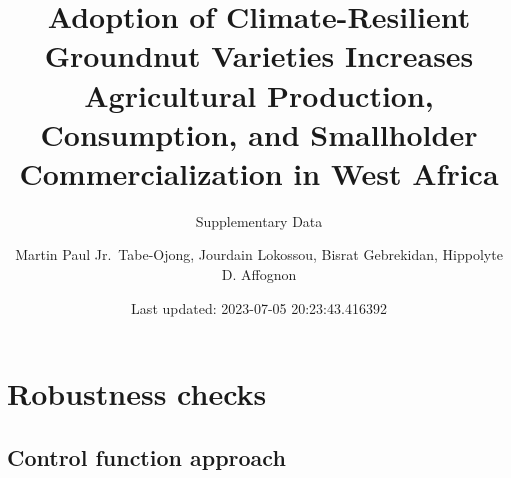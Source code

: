 \documentclass[
]{article}
\title{Adoption of Climate-Resilient Groundnut Varieties Increases Agricultural Production, Consumption, and Smallholder Commercialization in West Africa}
\subtitle{Supplementary Data}
\author{Martin Paul Jr.~Tabe-Ojong, Jourdain Lokossou, Bisrat Gebrekidan, Hippolyte D. Affognon}
\date{Last updated: 2023-07-05 20:23:43.416392}
\begin{document}
\maketitle

\newpage
\tableofcontents
\newpage
\listoftables
\newpage

\newpage

\hypertarget{robustness-checks}{%
\section{Robustness checks}\label{robustness-checks}}

\hypertarget{control-function-approach}{%
\subsection{Control function approach}\label{control-function-approach}}

\begingroup\fontsize{7}{9}\selectfont
\end{document}
